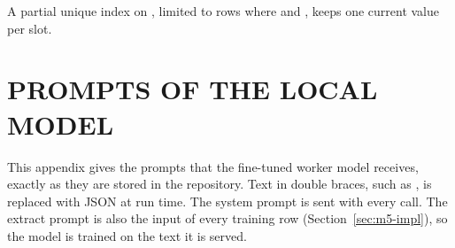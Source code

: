 A partial unique index on , limited to rows where
 and , keeps one current value per slot.

\chapter{\uppercase{Prompts of the Local Model}}
\label{app:prompts}
This appendix gives the prompts that the fine-tuned worker model receives, exactly as they are
stored in the repository. Text in double braces, such as , is replaced with
JSON at run time. The system prompt is sent with every call. The extract prompt is also the
input of every training row (Section~\ref{sec:m5-impl}), so the model is trained on the text it is served.



